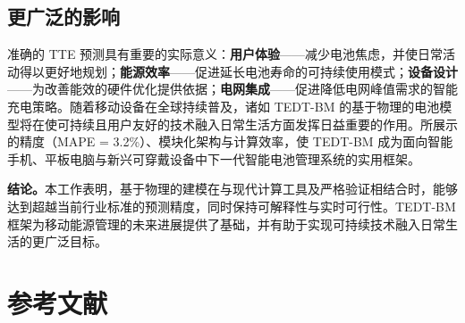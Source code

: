 \documentclass[11pt,a4paper]{ctexart}
\begin{document}
\subsection{更广泛的影响}

准确的 TTE 预测具有重要的实际意义：\textbf{用户体验}——减少电池焦虑，并使日常活动得以更好地规划；\textbf{能源效率}——促进延长电池寿命的可持续使用模式；\textbf{设备设计}——为改善能效的硬件优化提供依据；\textbf{电网集成}——促进降低电网峰值需求的智能充电策略。随着移动设备在全球持续普及，诸如 TEDT-BM 的基于物理的电池模型将在使可持续且用户友好的技术融入日常生活方面发挥日益重要的作用。所展示的精度（MAPE = 3.2\%）、模块化架构与计算效率，使 TEDT-BM 成为面向智能手机、平板电脑与新兴可穿戴设备中下一代智能电池管理系统的实用框架。

\textbf{结论。}本工作表明，基于物理的建模在与现代计算工具及严格验证相结合时，能够达到超越当前行业标准的预测精度，同时保持可解释性与实时可行性。TEDT-BM 框架为移动能源管理的未来进展提供了基础，并有助于实现可持续技术融入日常生活的更广泛目标。

\section*{参考文献}
\end{document}
